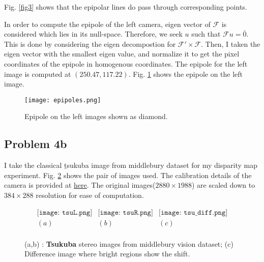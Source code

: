 \documentclass[11pt]{article}
\newcommand{\Ff}{\mathcal{F}}
\begin{document}
\par Fig. \ref{fig3} shows that the epipolar lines do pass through corresponding points. 

In order to compute the epipole of the left camera, eigen vector of $\Ff$ is considered which lies in its null-space. Therefore, we seek $u$ such that $\Ff u = \bar{0}$.  This is done by considering the eigen decompostion for $\Ff' \times \Ff$. Then, I taken the eigen vector with the smallest eigen value, and normalize it to get the pixel coordinates of the epipole in homogenous coordinates.  The epipole for the left image is computed at $(250.47,117.22)$. Fig. \ref{fig4} shows the epipole on the left image.

\begin{figure}[t]
  \texttt{[image: epipoles.png]}
  \caption{Epipole on the left images shown as diamond. }
  \label{fig4}
\end{figure}

\subsection{Problem 4b}
  
    \par I take the classical {\b tsukuba} image from middlebury dataset for my disparity map experiment. Fig. \ref{fig5} shows the pair of images used. The calibration details of the camera is provided at \href{http://vision.middlebury.edu/stereo/data/scenes2014/datasets/Adirondack-perfect/calib.txt}{here}. The original images($2880 \times 1988$) are scaled down to $384 \times 288$ resolution for ease of computation.
    
 \begin{figure}[!hbt]
\vspace{-10pt}
 \begin{center}
  \[ \begin{array}{ccc}
	  \texttt{[image: tsuL.png]} &
	  \texttt{[image: tsuR.png]} & 
	  \texttt{[image: tsu\_diff.png]} \\
	  (a) & (b) & (c) \\
	  \end{array} \]
  \end{center}
  \vspace{-10pt}
  \caption{(a,b) : {\bf Tsukuba} stereo images from middlebury vision dataset; (c) Difference image where bright regions show the shift. }
  \label{fig5}
    \vspace{-10pt}
\end{figure}
\end{document}
